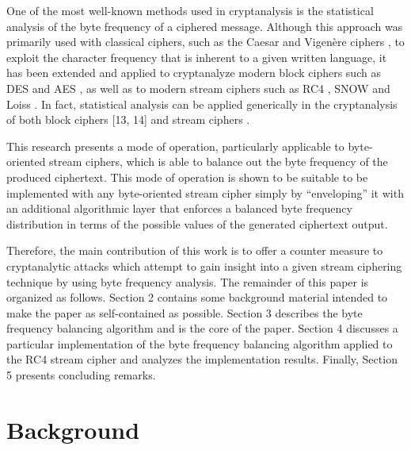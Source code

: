\documentclass[conference]{IEEEtran}
\begin{document}
One of the most well-known methods used in cryptanalysis is the statistical analysis of the byte frequency of a ciphered message. Although this approach was primarily used with classical ciphers, such as the Caesar and Vigenère ciphers \cite{william-stallings}, to exploit the character frequency that is inherent to a given written language, it has been extended and applied to cryptanalyze modern block ciphers such as DES \cite{nist,feng} and AES \cite{aes, vaudenay}, as well as to modern stream ciphers such as RC4 \cite{rivest, gaithuru, fluhrer}, SNOW \cite{ekdahl, ekdahl2} and Loiss \cite{feng, gupta}. In fact, statistical analysis can be applied generically in the cryptanalysis of both block ciphers \cite{filiol, junod} [13, 14] and stream ciphers \cite{englund, fischer,bokhari}.  

This research presents a mode of operation, particularly applicable to byte-oriented stream ciphers, which is able to balance out the byte frequency of the produced ciphertext. This mode of operation is shown to be suitable to be implemented with any byte-oriented stream cipher simply by “enveloping” it with an additional algorithmic layer that enforces a balanced byte frequency distribution in terms of the possible values of the generated ciphertext output. 

Therefore, the main contribution of this work is to offer a counter measure to cryptanalytic attacks which attempt to gain insight into a given stream ciphering technique by using byte frequency analysis. 
The remainder of this paper is organized as follows. Section 2 contains some background material intended to make the paper as self-contained as possible. Section 3 describes the byte frequency balancing algorithm and is the core of the paper. Section 4 discusses a particular implementation of the byte frequency balancing algorithm applied to the RC4 stream cipher and analyzes the implementation results. Finally, Section 5 presents concluding remarks.



 

\section{Background}
\end{document}
